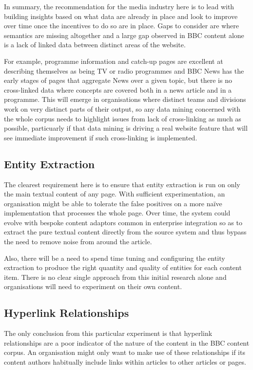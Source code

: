 In summary, the recommendation for the media industry here is to lead
with building insights based on what data are already in place and
look to improve over time once the incentives to do so are in place.
Gaps to consider are where semantics are missing altogether and a
large gap observed in BBC content alone is a lack of linked data
between distinct areas of the website.

For example, programme
information and catch-up pages are excellent at describing themselves
as being TV or radio programmes and BBC News has the early stages of
pages that aggregate News over a given topic, but there is no
cross-linked data where concepts are covered both in a news article
and in a programme. This will emerge in organisations where distinct
teams and divisions work on very distinct parts of their output, so
any data mining concerned with the whole corpus needs to highlight
issues from lack of cross-linking as much as possible, particuarly
if that data mining is driving a real website feature that will see
immediate improvement if such cross-linking is implemented.

\subsection{Entity Extraction}

The clearest requirement here is to ensure that entity extraction
is run on only the main textual content of any page. With sufficient
experimentation, an organisation might be able to tolerate the false
positives on a more na\"ive implementation that processes the whole
page. Over time, the system could evolve with bespoke content
adaptors common in enterprise integration so as to extract the pure
textual content directly from the source system and thus bypass
the need to remove noise from around the article.

Also, there will be a need to spend time tuning and configuring
the entity extraction to produce the right quantity and quality of
entities for each content item. There is no clear single approach
from this initial research alone and organisations will need to
experiment on their own content.

\subsection{Hyperlink Relationships}

The only conclusion from this particular experiment is that
hyperlink relationships are a poor indicator of the nature of the
content in the BBC content corpus. An organisation might only want to
make use of these relationships if its content authors habitually
include links within articles to other articles or pages.
